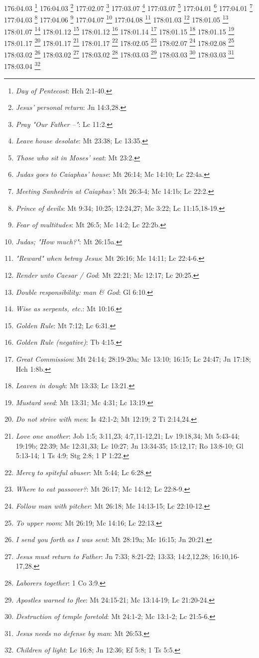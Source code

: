 176:04.03 \footnote{\textit{Day of Pentecost}: Hch 2:1-40.}
176:04.03 \footnote{\textit{Jesus' personal return}: Jn 14:3,28.}
177:02.07 \footnote{\textit{Pray "Our Father --"}: Lc 11:2.}
177:03.07 \footnote{\textit{Leave house desolate}: Mt 23:38; Lc 13:35.}
177:03.07 \footnote{\textit{Those who sit in Moses' seat}: Mt 23:2.}
177:04.01 \footnote{\textit{Judas goes to Caiaphas' house}: Mt 26:14; Mc 14:10; Lc 22:4a.}
177:04.01 \footnote{\textit{Meeting Sanhedrin at Caiaphas'}: Mt 26:3-4; Mc 14:1b; Lc 22:2.}
177:04.03 \footnote{\textit{Prince of devils}: Mt 9:34; 10:25; 12:24,27; Mc 3:22; Lc 11:15,18-19.}
177:04.06 \footnote{\textit{Fear of multitudes}: Mt 26:5; Mc 14:2; Lc 22:2b.}
177:04.07 \footnote{\textit{Judas; "How much?"}: Mt 26:15a.}
177:04.08 \footnote{\textit{"Reward" when betray Jesus}: Mt 26:16; Mc 14:11; Lc 22:4-6.}
178:01.03 \footnote{\textit{Render unto Caesar / God}: Mt 22:21; Mc 12:17; Lc 20:25.}
178:01.05 \footnote{\textit{Double responsibility: man & God}: Gl 6:10.}
178:01.07 \footnote{\textit{Wise as serpents, etc.}: Mt 10:16.}
178:01.12 \footnote{\textit{Golden Rule}: Mt 7:12; Lc 6:31.}
178:01.12 \footnote{\textit{Golden Rule (negative)}: Tb 4:15.}
178:01.14 \footnote{\textit{Great Commission}: Mt 24:14; 28:19-20a; Mc 13:10; 16:15; Lc 24:47; Jn 17:18; Hch 1:8b.}
178:01.15 \footnote{\textit{Leaven in dough}: Mt 13:33; Lc 13:21.}
178:01.15 \footnote{\textit{Mustard seed}: Mt 13:31; Mc 4:31; Lc 13:19.}
178:01.17 \footnote{\textit{Do not strive with men}: Is 42:1-2; Mt 12:19; 2 Ti 2:14,24.}
178:01.17 \footnote{\textit{Love one another}: Job 1:5; 3:11,23; 4:7,11-12,21; Lv 19:18,34; Mt 5:43-44; 19:19b; 22:39; Mc 12:31,33; Lc 10:27; Jn 13:34-35; 15:12,17; Ro 13:8-10; Gl 5:13-14; 1 Ts 4:9; Stg 2:8; 1 P 1:22.}
178:01.17 \footnote{\textit{Mercy to spiteful abuser}: Mt 5:44; Lc 6:28.}
178:02.05 \footnote{\textit{Where to eat passover?}: Mt 26:17; Mc 14:12; Lc 22:8-9.}
178:02.07 \footnote{\textit{Follow man with pitcher}: Mt 26:18; Mc 14:13-15; Lc 22:10-12.}
178:02.08 \footnote{\textit{To upper room}: Mt 26:19; Mc 14:16; Lc 22:13.}
178:03.02 \footnote{\textit{I send you forth as I was sent}: Mt 28:19a; Mc 16:15; Jn 20:21.}
178:03.02 \footnote{\textit{Jesus must return to Father}: Jn 7:33; 8:21-22; 13:33; 14:2,12,28; 16:10,16-17,28.}
178:03.02 \footnote{\textit{Laborers together}: 1 Co 3:9.}
178:03.03 \footnote{\textit{Apostles warned to flee}: Mt 24:15-21; Mc 13:14-19; Lc 21:20-24.}
178:03.03 \footnote{\textit{Destruction of temple foretold}: Mt 24:1-2; Mc 13:1-2; Lc 21:5-6.}
178:03.03 \footnote{\textit{Jesus needs no defense by man}: Mt 26:53.}
178:03.04 \footnote{\textit{Children of light}: Lc 16:8; Jn 12:36; Ef 5:8; 1 Ts 5:5.}

